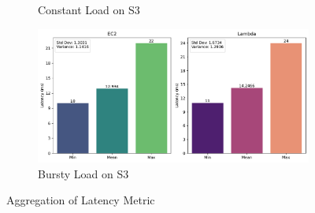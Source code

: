 \begin{figure}[h]
\begin{subfigure}{0.49\linewidth}
		\caption{Constant Load on S3}
		\label{fig:bar_s3_const}
	\end{subfigure}
	\hfill
	\begin{subfigure}{0.49\linewidth}
		\centering
		\includegraphics[width=\linewidth]{./fig/bar-s3-bursty.pdf}
		\caption{Bursty Load on S3}
		\label{fig:bar_s3_bursty}
	\end{subfigure}
	\caption{Aggregation of Latency Metric}
	\label{fig:bar-plots}
\end{figure}

